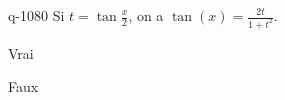 \begin{truefalse}{q-1080}
Si $t=\tan\frac{x}{2}$, on a $\tan(x)=\frac{2t}{1+t^2}$.
\item Vrai
\item* Faux
\end{truefalse}

